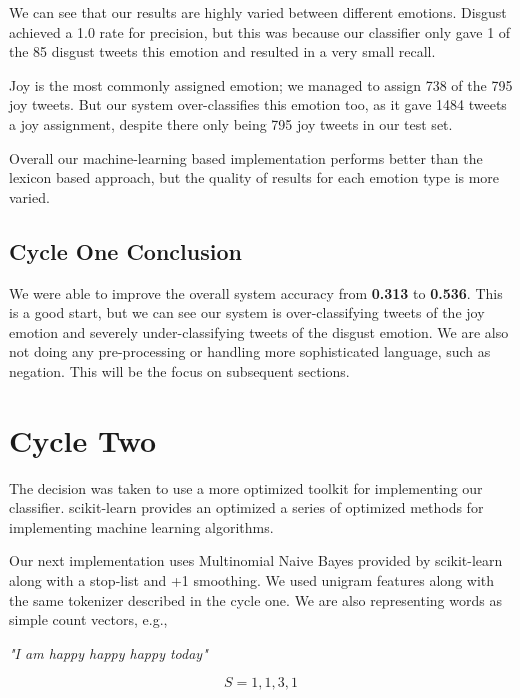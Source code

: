 \fi

We can see that our results are highly varied between different emotions. Disgust achieved a 1.0 rate for precision, but this was because our classifier only gave 1 of the 85 disgust tweets this emotion and resulted in a very small recall.

Joy is the most commonly assigned emotion; we managed to assign 738 of the 795 joy tweets. But our system over-classifies this emotion too, as it gave 1484 tweets a joy assignment, despite there only being 795 joy tweets in our test set. 

Overall our machine-learning based implementation performs better than the lexicon based approach, but the quality of results for each emotion type is more varied.


\subsection{Cycle One Conclusion}

We were able to improve the overall system accuracy from \textbf{0.313} to \textbf{0.536}. This is a good start, but we can see our system is over-classifying tweets of the joy emotion and severely under-classifying tweets of the disgust emotion. We are also not doing any pre-processing or handling more sophisticated language, such as negation. This will be the focus on subsequent sections. 

\section{Cycle Two} \label{cy2}

The decision was taken to use a more optimized toolkit for implementing our classifier. scikit-learn \cite{scikit} provides an optimized a series of optimized methods for implementing machine learning algorithms.

Our next implementation uses Multinomial Naive Bayes provided by scikit-learn along with a stop-list and +1 smoothing. We used unigram features along with the same tokenizer described in the cycle one. We are also representing words as simple count vectors, e.g.,

\begin{center}
\textit {\@william "I am happy happy happy today"}
\end{center}

\begin{equation} \label{count_vector}
S = {1,1,3,1}
\end{equation}

